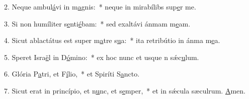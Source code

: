 2. Neque ambul\uline{á}vi in m\uline{a}gnis:~* neque in mirabílibs sup\uline{e}r me.\par 
3. Si non humíliter s\uline{e}nti\uline{é}bam:~* sed exaltávi ánmam m\uline{e}am.\par 
4. Sicut ablactátus est super m\uline{a}tre s\uline{u}a:~* ita retribútio in ánma m\uline{e}a.\par 
5. Speret Isra\uline{ë}l in D\uline{ó}mino:~* ex hoc nunc et usque n sǽc\uline{u}lum.\par 
6. Glória P\uline{a}tri, et F\uline{í}lio,~* et Spiríti S\uline{a}ncto.\par 
7. Sicut erat in princípio, et n\uline{u}nc, et s\uline{e}mper,~* et in sǽcula sæculrum. \uline{A}men.\par 
